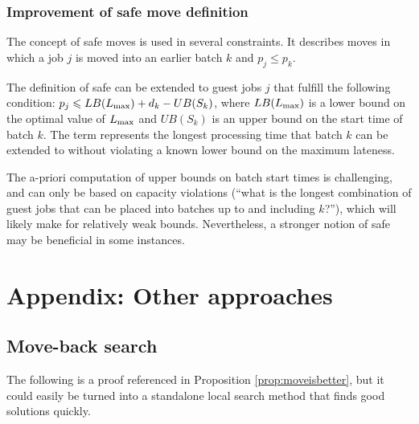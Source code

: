 \documentclass[13pt, letterpaper, oneside]{book}
\begin{document}
\subsection[Improvement of \textit{safe move} definition]{Improvement of {\sansitalicfont safe move} definition}
The concept of safe moves is used in several constraints. It describes moves
in which a job $j$ is moved into an earlier batch $k$ and $p_j \leq p_k$.

The definition of safe can be extended to guest jobs $j$ that fulfill the
following condition: $p_j \leqslant LB(L_{\text{max}}) + d_k - UB(S_k)$, where $LB(L_{\text{max}})$ is
a lower bound on the optimal value of $L_{\text{max}}$ and $UB(S_k)$ is an upper bound on
the start time of batch $k$. The term represents the longest processing time
that batch $k$ can be extended to without violating a known lower bound on the
maximum lateness.

The a-priori computation of upper bounds on batch start times is challenging,
and can only be based on capacity violations (``what is the longest combination of
guest jobs that can be placed into batches up to and including $k$?''), which
will likely make for relatively weak bounds. Nevertheless, a stronger notion of
safe may be beneficial in some instances.

\chapter{Appendix: Other approaches}
\section{Move-back search}
\label{sec:movebackproof}
The following is a proof referenced in Proposition \ref{prop:moveisbetter}, but
it could easily be turned into a standalone local search method that finds good
solutions quickly.
\end{document}

